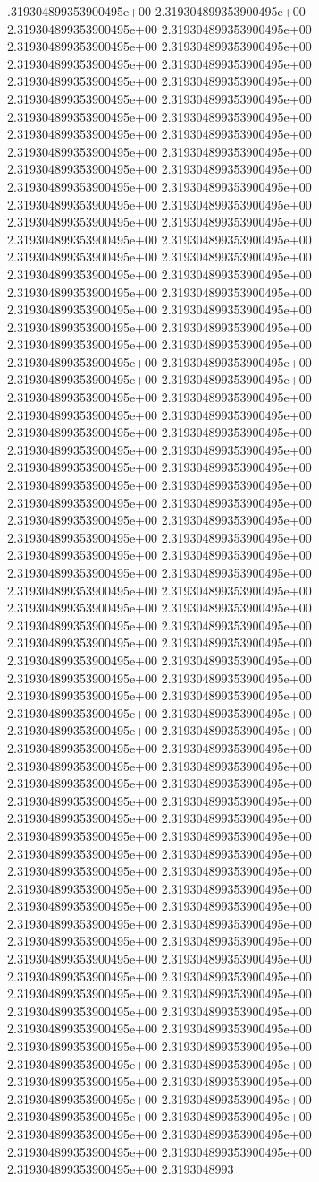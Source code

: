 .319304899353900495e+00	2.319304899353900495e+00	2.319304899353900495e+00	2.319304899353900495e+00	2.319304899353900495e+00	2.319304899353900495e+00	2.319304899353900495e+00	2.319304899353900495e+00	2.319304899353900495e+00	2.319304899353900495e+00	2.319304899353900495e+00	2.319304899353900495e+00	2.319304899353900495e+00	2.319304899353900495e+00	2.319304899353900495e+00	2.319304899353900495e+00	2.319304899353900495e+00	2.319304899353900495e+00	2.319304899353900495e+00	2.319304899353900495e+00	2.319304899353900495e+00	2.319304899353900495e+00	2.319304899353900495e+00	2.319304899353900495e+00	2.319304899353900495e+00	2.319304899353900495e+00	2.319304899353900495e+00	2.319304899353900495e+00	2.319304899353900495e+00	2.319304899353900495e+00	2.319304899353900495e+00	2.319304899353900495e+00	2.319304899353900495e+00	2.319304899353900495e+00	2.319304899353900495e+00	2.319304899353900495e+00	2.319304899353900495e+00	2.319304899353900495e+00	2.319304899353900495e+00	2.319304899353900495e+00	2.319304899353900495e+00	2.319304899353900495e+00	2.319304899353900495e+00	2.319304899353900495e+00	2.319304899353900495e+00	2.319304899353900495e+00	2.319304899353900495e+00	2.319304899353900495e+00	2.319304899353900495e+00	2.319304899353900495e+00	2.319304899353900495e+00	2.319304899353900495e+00	2.319304899353900495e+00	2.319304899353900495e+00	2.319304899353900495e+00	2.319304899353900495e+00	2.319304899353900495e+00	2.319304899353900495e+00	2.319304899353900495e+00	2.319304899353900495e+00	2.319304899353900495e+00	2.319304899353900495e+00	2.319304899353900495e+00	2.319304899353900495e+00	2.319304899353900495e+00	2.319304899353900495e+00	2.319304899353900495e+00	2.319304899353900495e+00	2.319304899353900495e+00	2.319304899353900495e+00	2.319304899353900495e+00	2.319304899353900495e+00	2.319304899353900495e+00	2.319304899353900495e+00	2.319304899353900495e+00	2.319304899353900495e+00	2.319304899353900495e+00	2.319304899353900495e+00	2.319304899353900495e+00	2.319304899353900495e+00	2.319304899353900495e+00	2.319304899353900495e+00	2.319304899353900495e+00	2.319304899353900495e+00	2.319304899353900495e+00	2.319304899353900495e+00	2.319304899353900495e+00	2.319304899353900495e+00	2.319304899353900495e+00	2.319304899353900495e+00	2.319304899353900495e+00	2.319304899353900495e+00	2.319304899353900495e+00	2.319304899353900495e+00	2.319304899353900495e+00	2.319304899353900495e+00	2.319304899353900495e+00	2.319304899353900495e+00	2.319304899353900495e+00	2.319304899353900495e+00	2.319304899353900495e+00	2.319304899353900495e+00	2.319304899353900495e+00	2.319304899353900495e+00	2.319304899353900495e+00	2.319304899353900495e+00	2.319304899353900495e+00	2.319304899353900495e+00	2.319304899353900495e+00	2.319304899353900495e+00	2.319304899353900495e+00	2.319304899353900495e+00	2.319304899353900495e+00	2.319304899353900495e+00	2.319304899353900495e+00	2.319304899353900495e+00	2.319304899353900495e+00	2.319304899353900495e+00	2.319304899353900495e+00	2.319304899353900495e+00	2.319304899353900495e+00	2.319304899353900495e+00	2.319304899353900495e+00	2.319304899353900495e+00	2.319304899353900495e+00	2.319304899353900495e+00	2.319304899353900495e+00	2.319304899353900495e+00	2.319304899353900495e+00	2.319304899353900495e+00	2.319304899353900495e+00	2.319304899353900495e+00	2.319304899353900495e+00	2.3193048993